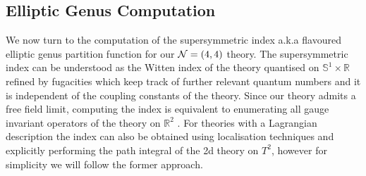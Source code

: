 \documentclass[main.tex]{subfiles}
\begin{document}
\subsection{Elliptic Genus Computation}
We now turn to the computation of the supersymmetric index a.k.a flavoured elliptic genus partition function for our $\mathcal{N}=(4,4)$ theory.
The supersymmetric index can be understood as the Witten index of the theory quantised on $\mathbb{S}^1\times \mathbb{R}$ refined by fugacities which keep track of further relevant quantum numbers and it is independent of the coupling constants of the theory.
 Since our theory admits a free field limit, computing the index is equivalent to enumerating all gauge invariant operators of the theory on $\mathbb{R}^2$ \cite{Putrov:2015jpa,Gadde:2013wq,Gadde:2013ftv,Gadde:2014ppa,Gadde:2013lxa,Nakayama:2011pa,Cordova:2017ohl}. 
For theories with a Lagrangian description the index  can also be obtained using localisation techniques \cite{Benini:2013nda,Benini:2013xpa} and explicitly performing the path integral of the 2d theory on $T^2$, however for simplicity we will follow the former approach.
\end{document}
